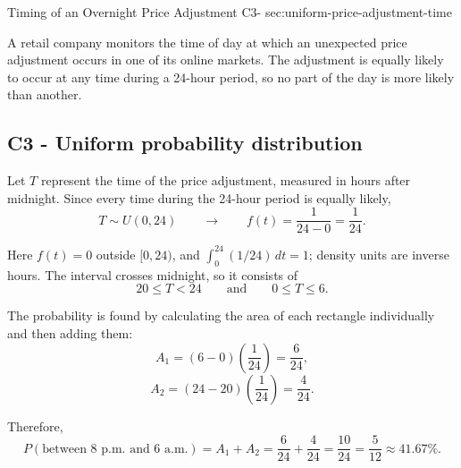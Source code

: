 	\sectionScored
	{Timing of an Overnight Price Adjustment}
	{C3-}
	{sec:uniform-price-adjustment-time}
	{
		A retail company monitors the time of day at which an unexpected
		price adjustment occurs in one of its online markets. The adjustment
		is equally likely to occur at any time during a 24-hour period,
		so no part of the day is more likely than another.
		
		
		\label{subsec:uniform-price-adjustment-time-probability}
		\subsection*{C3 - Uniform probability distribution }
		
		Let \(T\) represent the time of the price adjustment, measured in hours
		after midnight. Since every time during the 24-hour period is equally
		likely,
		\[
		T\sim U(0,24)
		\qquad \longrightarrow \qquad
		f(t)=\frac1{24-0}=\frac1{24}.
		\]
		
		Here \(f(t)=0\) outside \([0,24)\), and
        \(\int_0^{24}(1/24)\,dt=1\); density units are inverse hours.
		The interval crosses midnight, so it consists of
		\[
		20\le T<24
		\qquad\text{and}\qquad
		0\le T\le6.
		\]
		
		The probability is found by calculating the area of each rectangle
		individually and then adding them:
		\[
		A_1=(6-0)\left(\frac1{24}\right)
		=\frac6{24},
		\]
		\[
		A_2=(24-20)\left(\frac1{24}\right)
		=\frac4{24}.
		\]
		
		Therefore,
		\[
		P(\text{between 8 p.m. and 6 a.m.})
		=
		A_1+A_2
		=
		\frac6{24}+\frac4{24}
		=
		\frac{10}{24}
		=
		\boxed{\frac5{12}\approx41.67\%}.
		\]
		
		}
